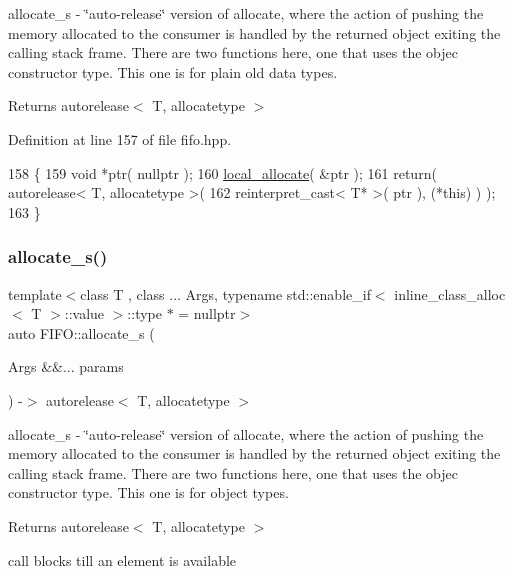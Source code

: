 allocate\+\_\+s -\/ \char`\"{}auto-\/release\char`\"{} version of allocate, where the action of pushing the memory allocated to the consumer is handled by the returned object exiting the calling stack frame. There are two functions here, one that uses the objec constructor type. This one is for plain old data types. \begin{DoxyReturn}{Returns}
autorelease$<$ T, allocatetype $>$ 
\end{DoxyReturn}


Definition at line 157 of file fifo.\+hpp.


\begin{DoxyCode}
158    \{
159       \textcolor{keywordtype}{void} *ptr( \textcolor{keyword}{nullptr} );
160       \hyperlink{class_f_i_f_o_a60068cb00b13626e41d4b11099354ae3}{local\_allocate}( &ptr );
161       \textcolor{keywordflow}{return}( autorelease< T, allocatetype >( 
162          reinterpret\_cast< T* >( ptr ), (*\textcolor{keyword}{this}) ) );
163    \}
\end{DoxyCode}
\hypertarget{class_f_i_f_o_aa5f5334a93f8a014eb19d488898a2e39}{}\label{class_f_i_f_o_aa5f5334a93f8a014eb19d488898a2e39} 
\subsubsection{\texorpdfstring{allocate\+\_\+s()}{allocate\_s()}\hspace{0.1cm}{\footnotesize\ttfamily [2/2]}}
{\footnotesize\ttfamily template$<$class T , class ... Args, typename std\+::enable\+\_\+if$<$ inline\+\_\+class\+\_\+alloc$<$ T $>$\+::value $>$\+::type $\ast$  = nullptr$>$ \\
auto F\+I\+F\+O\+::allocate\+\_\+s (\begin{DoxyParamCaption}\item[{Args \&\&...}]{params }\end{DoxyParamCaption}) -\/$>$ autorelease$<$ T, allocatetype $>$
   \hspace{0.3cm}{\ttfamily [inline]}}

allocate\+\_\+s -\/ \char`\"{}auto-\/release\char`\"{} version of allocate, where the action of pushing the memory allocated to the consumer is handled by the returned object exiting the calling stack frame. There are two functions here, one that uses the objec constructor type. This one is for object types. \begin{DoxyReturn}{Returns}
autorelease$<$ T, allocatetype $>$ 
\end{DoxyReturn}
call blocks till an element is available 


